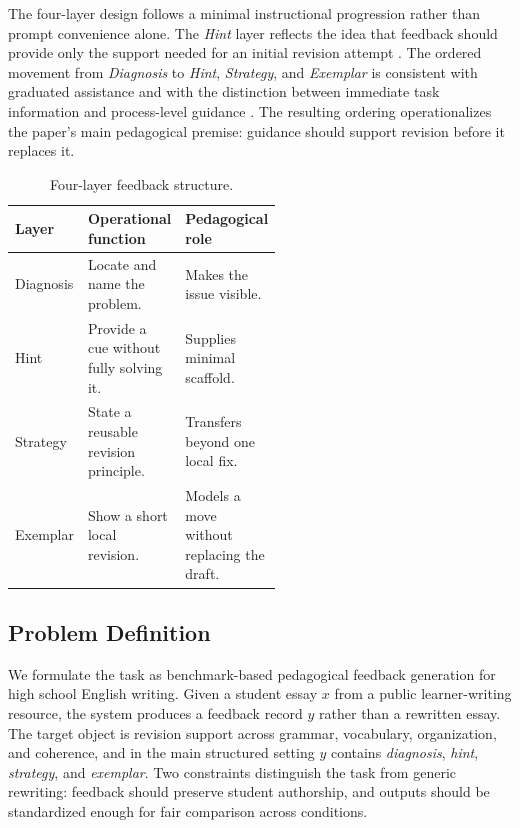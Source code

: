 \documentclass[preprint,12pt]{elsarticle}
\begin{document}
The four-layer design follows a minimal instructional progression rather than prompt convenience alone. The \textit{Hint} layer reflects the idea that feedback should provide only the support needed for an initial revision attempt \cite{vygotsky1978mind}. The ordered movement from \textit{Diagnosis} to \textit{Hint}, \textit{Strategy}, and \textit{Exemplar} is consistent with graduated assistance and with the distinction between immediate task information and process-level guidance \cite{aljaafreh1994negative,hattie2007power}. The resulting ordering operationalizes the paper's main pedagogical premise: guidance should support revision before it replaces it.

\begin{table}[t]
\centering
\scriptsize
\caption{Four-layer feedback structure.}
\begin{tabularx}{\linewidth}{@{}P{0.15\linewidth}P{0.38\linewidth}Y@{}}
\toprule
Layer & Operational function & Pedagogical role \\
\midrule
Diagnosis & Locate and name the problem. & Makes the issue visible. \\
Hint & Provide a cue without fully solving it. & Supplies minimal scaffold. \\
Strategy & State a reusable revision principle. & Transfers beyond one local fix. \\
Exemplar & Show a short local revision. & Models a move without replacing the draft. \\
\bottomrule
\end{tabularx}
\end{table}

\subsection{Problem Definition}

We formulate the task as benchmark-based pedagogical feedback generation for high school English writing. Given a student essay $x$ from a public learner-writing resource, the system produces a feedback record $y$ rather than a rewritten essay. The target object is revision support across grammar, vocabulary, organization, and coherence, and in the main structured setting $y$ contains \textit{diagnosis}, \textit{hint}, \textit{strategy}, and \textit{exemplar}. Two constraints distinguish the task from generic rewriting: feedback should preserve student authorship, and outputs should be standardized enough for fair comparison across conditions.
\end{document}
